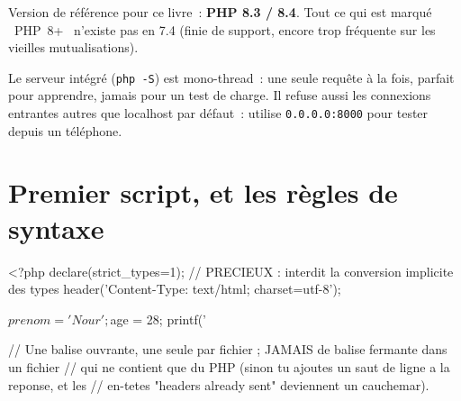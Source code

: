 Version de r\'ef\'erence pour ce livre~: \textbf{PHP 8.3 / 8.4}. Tout ce qui est marqu\'e \og ~PHP~8+~ \fg{}
n'existe pas en 7.4 (finie de support, encore trop fr\'equente sur les vieilles mutualisations).


\begin{note}
Le serveur int\'egr\'e (\verb|php -S|) est mono-thread~: une seule requ\^ete \`a la fois, parfait pour
apprendre, jamais pour un test de charge. Il refuse aussi les connexions entrantes autres que
localhost par d\'efaut~: utilise \verb|0.0.0.0:8000| pour tester depuis un t\'el\'ephone.
\end{note}

\section{Premier script, et les r\`egles de syntaxe}

\begin{codephp}
<?php
declare(strict_types=1);                    // PRECIEUX : interdit la conversion implicite des types
header('Content-Type: text/html; charset=utf-8');

$prenom = 'Nour';
$age = 28;
printf('%

// Une balise ouvrante, une seule par fichier ; JAMAIS de balise fermante dans un fichier
// qui ne contient que du PHP (sinon tu ajoutes un saut de ligne a la reponse, et les
// en-tetes "headers already sent" deviennent un cauchemar).
\end{codephp}

